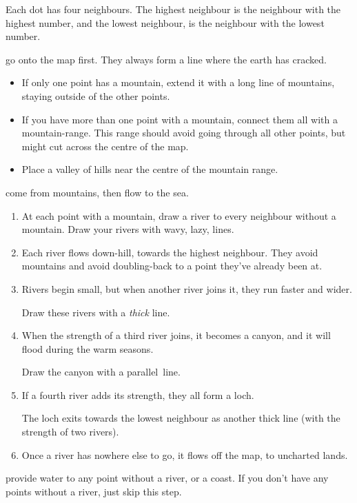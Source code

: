 \begin{multicols}{2}
Each dot has four neighbours.
The highest neighbour is the neighbour with the highest number, and the lowest neighbour, is the neighbour with the lowest number.

go onto the map first.
They always form a line where the earth has cracked.

\begin{itemize}
  \item
  If only one point has a mountain, extend it with a long line of mountains, staying outside of the other points.
  \item
  If you have more than one point with a mountain, connect them all with a mountain-range.
  This range should avoid going through all other points, but might cut across the centre of the map.
  \item
  Place a valley of hills near the centre of the mountain range.
\end{itemize}

\label{mapRivers}
come from mountains, then flow to the sea.

\begin{enumerate}
  \item
  At each point with a mountain, draw a river to every neighbour without a mountain.
  Draw your rivers with wavy, lazy, lines.
  \item
  Each river flows down-hill, towards the highest neighbour.
  They avoid mountains and avoid doubling-back to a point they've already been at.
  \item
  Rivers begin small, but when another river joins it, they run faster and wider.

  Draw these rivers with a \emph{thick} line.
  \item
  When the strength of a third river joins, it becomes a canyon, and it will flood during the warm seasons.

  Draw the canyon with a parallel~line.
  \item
  If a fourth river adds its strength, they all form a loch.
  
  The loch exits towards the lowest neighbour as another thick line (with the strength of two rivers).
  \item
  Once a river has nowhere else to go, it flows off the map, to uncharted lands.
\end{enumerate}

provide water to any point without a river, or a coast.
If you don't have any points without a river, just skip this step.


\end{multicols}
